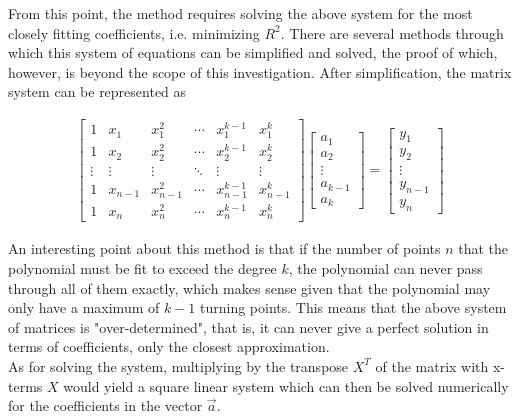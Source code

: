 \documentclass[12pt, a4paper]{article}
\begin{document}
From this point, the method requires solving the above system for the most
closely fitting coefficients, i.e. minimizing $R^2$. There are several methods
through which this system of equations can be simplified and solved, the proof
of which, however, is beyond the scope of this investigation. After
simplification, the matrix system can be represented as

\begin{align*}
    \begin{bmatrix}
        1      & x_1     & x_1^2     & \cdots & x_1^{k-1}     & x_1^k     \\
        1      & x_2     & x_2^2     & \cdots & x_2^{k-1}     & x_2^k     \\
        \vdots & \vdots  & \vdots    & \ddots & \vdots        & \vdots    \\
        1      & x_{n-1} & x_{n-1}^2 & \cdots & x_{n-1}^{k-1} & x_{n-1}^k \\
        1      & x_n     & x_n^2     & \cdots & x_n^{k-1}     & x_n^k
    \end{bmatrix}
    \begin{bmatrix}
        a_1 \\ a_2 \\ \vdots \\ a_{k-1} \\ a_k
    \end{bmatrix}
    =
    \begin{bmatrix}
        y_1 \\ y_2 \\ \vdots \\ y_{n-1} \\ y_n
    \end{bmatrix}
\end{align*}

An interesting point about this method is that if the number of points $n$ that
the polynomial must be fit to exceed the degree $k$, the polynomial can never
pass through all of them exactly, which makes sense given that the polynomial
may only have a maximum of $k-1$ turning points. This means that the above
system of matrices is "over-determined", that is, it can never give a perfect
solution in terms of coefficients, only the closest approximation. \\

As for solving the system, multiplying by the transpose $X^T$ of the matrix with
x-terms $X$ would yield a square linear system which can then be solved
numerically for the coefficients in the vector $\vec{a}$.
\end{document}

